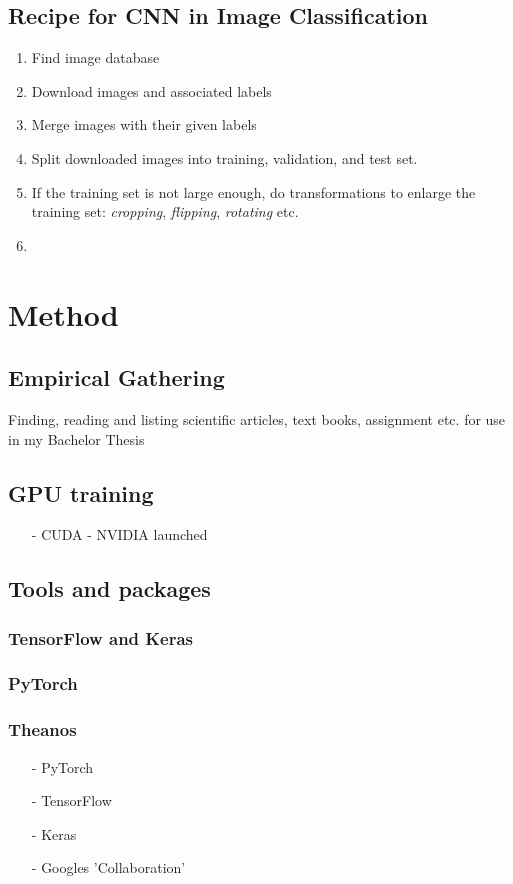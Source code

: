 \documentclass[a4paper,11pt]{article}
\begin{document}
\subsection{Recipe for CNN in Image Classification}
\begin{enumerate}
	\item Find image database
	\item Download images and associated labels
	\item Merge images with their given labels
	\item Split downloaded images into training, validation, and test set.
	\item If the training set is not large enough, do transformations to enlarge the training set: \textit{cropping}, \textit{flipping}, \textit{rotating} etc.
	\item 
\end{enumerate}
\section{Method}
\subsection{Empirical Gathering}
Finding, reading and listing scientific articles, text books, assignment etc. for use in my Bachelor Thesis 

\subsection{GPU training}
\begin{itemize}
	\item[-] CUDA - NVIDIA launched 
\end{itemize}
\subsection{Tools and packages}
\subsubsection{TensorFlow and Keras}
\subsubsection{PyTorch}
\subsubsection{Theanos}
\begin{itemize}
	\item[-] PyTorch
	\item[-] TensorFlow
	\item[-] Keras
	\item[-] Googles 'Collaboration'
\end{itemize}
\end{document}
